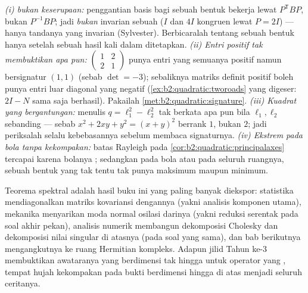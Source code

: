\begin{remark}
\emph{(i)  bukan keserupaan:} penggantian basis bagi
sebuah bentuk bekerja lewat $P^{\mathsf T}BP$, bukan $P^{-1}BP$; jadi
 \emph{bukan} invarian sebuah  ($I$ dan $4I$
kongruen lewat $P = 2I$) --- hanya tandanya yang invarian
(Sylvester). Berbicaralah tentang  sebuah bentuk hanya setelah
sebuah hasil kali dalam ditetapkan. \emph{(ii) Entri positif tak
membuktikan apa pun:} $\begin{pmatrix} 1 & 2\\ 2 & 1\end{pmatrix}$ punya
entri yang semuanya positif namun bersignatur $(1,1)$ (sebab $\det = -3$);
sebaliknya matriks definit positif boleh punya entri luar diagonal yang
negatif (\cref{ex:b2:quadratic:tworoads} yang digeser:
$2I - N$ sama saja berhasil). Pakailah
\cref{met:b2:quadratic:signature}. \emph{(iii) Kuadrat yang
bergantungan:} menulis $q = \ell_1^2 - \ell_2^2$ tak berkata apa pun bila
$\ell_1, \ell_2$ sebanding --- sebab $x^2 + 2xy + y^2 =
(x+y)^2$ berrank $1$, bukan $2$; jadi periksalah selalu kebebasannya
sebelum membaca signaturnya. \emph{(iv) Ekstrem pada bola
tanpa kekompakan:} batas Rayleigh pada
\cref{cor:b2:quadratic:principalaxes} tercapai karena
bolanya ; sedangkan pada bola  atau pada seluruh ruangnya, sebuah
bentuk yang tak tentu tak punya maksimum maupun minimum.
\end{remark}

\begin{remark}
Teorema spektral adalah hasil buku ini yang paling banyak diekspor:
statistika mendiagonalkan matriks kovariansi dengannya
(yakni analisis komponen utama), mekanika menyarikan moda normal
osilasi darinya (yakni reduksi serentak pada
soal akhir pekan), analisis numerik membangun dekomposisi Cholesky dan
dekomposisi nilai singular di atasnya (pada soal yang sama), dan bab
berikutnya mengangkutnya ke ruang Hermitian kompleks. Adapun jilid
Tahun ke-3 membuktikan awataranya yang berdimensi tak hingga untuk operator
 yang , tempat hujah kekompakan pada bukti berdimensi
hingga di atas menjadi seluruh ceritanya.
\end{remark}

